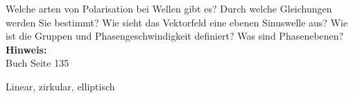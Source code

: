 \begin{question}[section=5,subsection=52,name={Poleristaion von Wellen},difficulty=6,type=mdl,mode=exm,tags={}]
	Welche arten von Polarisation bei Wellen gibt es? Durch welche Gleichungen werden Sie bestimmt? Wie sieht das Vektorfeld eine ebenen Sinuswelle aus? Wie ist die Gruppen und Phasengeschwindigkeit definiert? Was sind Phasenebenen?
	\\ \textbf{Hinweis:}\\
	Buch Seite 135
\end{question}
\begin{solution}
	Linear, zirkular, elliptisch
\end{solution}